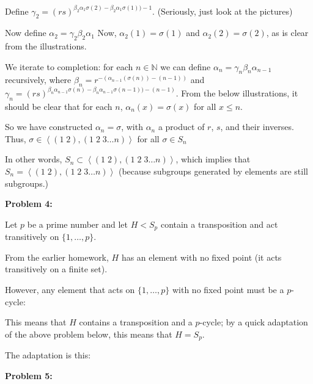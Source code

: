 \documentclass[a4paper,12pt]{article}
\newcommand{\tab}{\hspace{4mm}} %
\newcommand{\shunt}{\vspace{20mm}}
\newcommand{\anbrack}[1]{\left\langle #1 \right\rangle}
\newcommand{\al}{\alpha} %
\newcommand{\be}{\beta}
\newcommand{\ga}{\gamma}
\newcommand{\N}{\mathbb{N}}
\begin{document}
\shunt %

\shunt

\tab Define $\ga_2 = (rs)^{\be_2\al_1\sigma(2)-\be_2\al_1\sigma(1)) -1}$. (Seriously, just look at the pictures)

\shunt %

\shunt

\tab Now define $\al_2 = \ga_2\be_2\al_1$ Now, $\al_2(1) = \sigma(1)$ and $\al_2(2) = \sigma(2)$, as is clear from the illustrations.

\tab We iterate to completion: for each $n \in \N$ we can define $\al_n = \ga_n\be_n\al_{n-1}$ recursively, where $\be_n = r^{-(\al_{n-1}(\sigma(n))-(n-1))}$ and $\ga_n = (rs)^{\be_n\al_{n-1}\sigma(n)-\be_n\al_{n-1}\sigma(n-1)) -(n-1)}$. From the below illustrations, it should be clear that for each $n$, $\al_n(x) = \sigma(x)$ for all $x \leq n$.

\shunt %

\shunt

\tab So we have constructed $\al_n = \sigma$, with $\al_n$ a product of $r$, $s$, and their inverses. Thus, $\sigma \in \anbrack{(1 \; 2) , (1 \; 2 \; 3 \ldots n)}$ for all $\sigma \in S_n$

In other words, $S_n \subset \anbrack{(1 \; 2) , (1 \; 2 \; 3 \ldots n)}$, which implies that $S_n = \anbrack{(1 \; 2) , (1 \; 2 \; 3 \ldots n)}$ (because subgroups generated by elements are still subgroups.)

\shunt

{\bf Problem 4:}

Let $p$ be a prime number and let $H<S_p$ contain a transposition and act transitively on $\{1,\ldots,p\}$.

From the earlier homework, $H$ has an element with no fixed point (it acts transitively on a finite set).

However, any element that acts on $\{1, \ldots, p\}$ with no fixed point must be a $p$-cycle:

\tab %

This means that $H$ contains a transposition and a $p$-cycle; by a quick adaptation of the above problem below, this means that $H = S_p$.

The adaptation is this: %

\shunt

{\bf Problem 5:}
\end{document}
